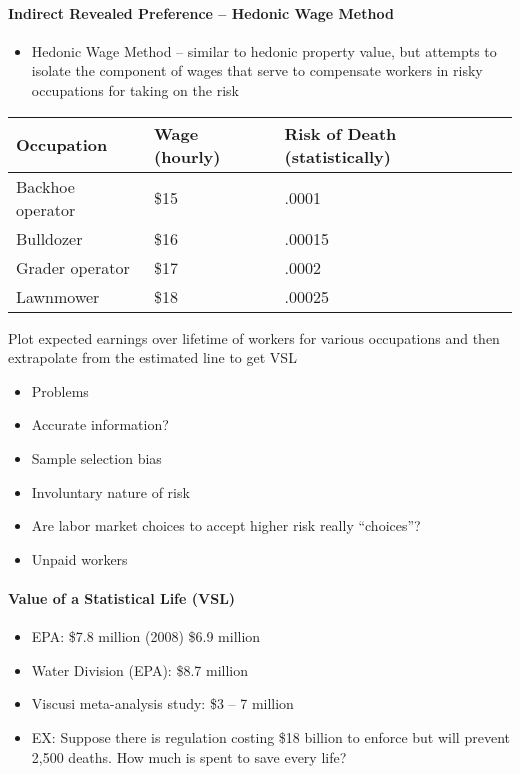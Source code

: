 \documentclass[]{article}
\providecommand{\tightlist}{%
  \setlength{\itemsep}{0pt}\setlength{\parskip}{0pt}}
\let\oldparagraph\paragraph
\renewcommand{\paragraph}[1]{\oldparagraph{#1}\mbox{}}
\begin{document}
\hypertarget{indirect-revealed-preference-hedonic-wage-method}{%
\paragraph{Indirect Revealed Preference -- Hedonic Wage
Method}\label{indirect-revealed-preference-hedonic-wage-method}}

\begin{itemize}
\tightlist
\item
  Hedonic Wage Method -- similar to hedonic property value, but attempts
  to isolate the component of wages that serve to compensate workers in
  risky occupations for taking on the risk
\end{itemize}

\begin{longtable}[]{@{}lll@{}}
\toprule
Occupation & Wage (hourly) & Risk of Death
(statistically)\tabularnewline
\midrule
\endhead
Backhoe operator & \$15 & .0001\tabularnewline
Bulldozer & \$16 & .00015\tabularnewline
Grader operator & \$17 & .0002\tabularnewline
Lawnmower & \$18 & .00025\tabularnewline
\bottomrule
\end{longtable}

Plot expected earnings over lifetime of workers for various occupations
and then extrapolate from the estimated line to get VSL

\begin{itemize}
\tightlist
\item
  Problems
\item
  Accurate information?
\item
  Sample selection bias
\item
  Involuntary nature of risk
\item
  Are labor market choices to accept higher risk really ``choices''?
\item
  Unpaid workers
\end{itemize}

\hypertarget{value-of-a-statistical-life-vsl}{%
\paragraph{Value of a Statistical Life
(VSL)}\label{value-of-a-statistical-life-vsl}}

\begin{itemize}
\item
  EPA: \$7.8 million (2008) \$6.9 million
\item
  Water Division (EPA): \$8.7 million
\item
  Viscusi meta-analysis study: \$3 -- 7 million
\item
  EX: Suppose there is regulation costing \$18 billion to enforce but
  will prevent 2,500 deaths. How much is spent to save every life?
\end{itemize}
\end{document}

